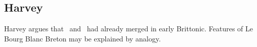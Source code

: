 \subsection{Harvey}
\label{harveylenition}
Harvey argues that \xD\ and \lT\ had already merged in early Brittonic. Features of Le Bourg Blanc Breton may be explained by analogy.

